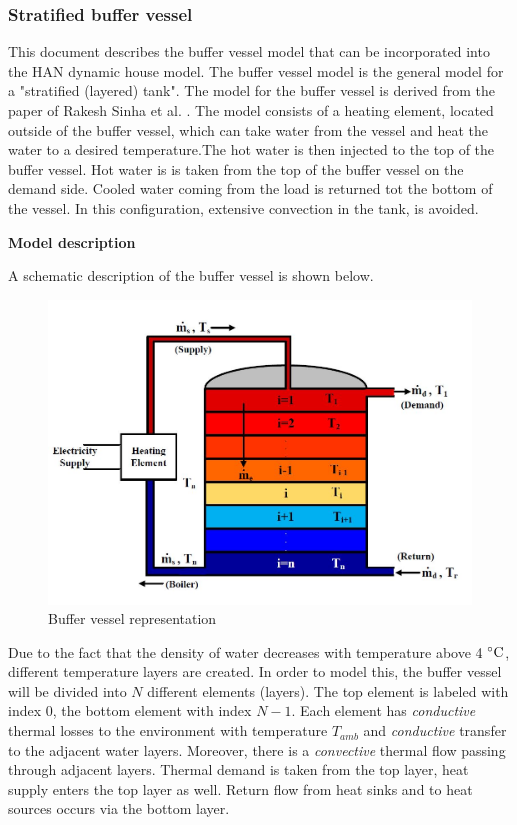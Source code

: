 \subsubsection{Stratified buffer vessel}

This document describes the buffer vessel model that can be incorporated into the HAN dynamic house model. The buffer vessel model is the general model for a "stratified (layered) tank". The model for the buffer vessel is derived from the paper of Rakesh Sinha et al. \cite{sinha2020flexibility}. The model consists of a heating element, located outside of the buffer vessel, which can take water from the vessel and heat the water to a desired temperature.The hot water is then injected to the top of the buffer vessel. Hot water is is taken from the top of the buffer vessel on the demand side. Cooled water coming from the load is returned tot the bottom of the vessel. In this configuration, extensive convection in the tank, is avoided. 

\textbf{Model description}

A schematic description of the buffer vessel is shown below.

\begin{figure}[H]
	\centering
	\includegraphics[width=0.8\columnwidth]{Figures/buffervessel_setup.JPG}
	\caption[Short title]{Buffer vessel representation}
\end{figure}

Due to the fact that the density of water decreases with temperature above 4 $^\circ\mathrm{C}$, different temperature layers are created. In order to model this, the buffer vessel will be divided into $N$ different elements (layers). The top element is labeled with index $0$, the bottom element with index $N-1$. Each element has \emph{conductive} thermal losses to the environment with temperature $T_{amb}$ and \emph{conductive} transfer to the adjacent water layers. Moreover, there is a \emph{convective} thermal flow passing through adjacent layers. Thermal demand is taken from the top layer, heat supply enters the top layer as well. Return flow from heat sinks and to heat sources occurs via the bottom layer. 

